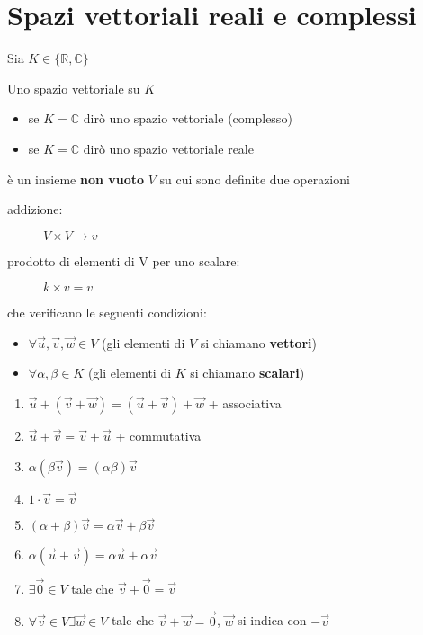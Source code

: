 \section{Spazi vettoriali reali e complessi}
Sia $K\in\{\mathbb{R},\mathbb{C}\}$

Uno spazio vettoriale su $K$
\begin{itemize}
    \item se $K=\mathbb{C}$ dirò uno spazio vettoriale (complesso)
    \item se $K=\mathbb{C}$ dirò uno spazio vettoriale reale
\end{itemize}
è un insieme \textbf{non vuoto} $V$ su cui sono definite due operazioni

\begin{description}
    \item[addizione:] $V \times V \longrightarrow v$
    \item[prodotto di elementi di V per uno scalare:] $k \times v = v$
\end{description}
che verificano le seguenti condizioni:
\begin{itemize}
    \item $\forall \vec{u}, \vec{v}, \vec{w} \in V$ (gli elementi di $V$ si chiamano \textbf{vettori})
    \item $\forall \alpha, \beta \in K$ (gli elementi di $K$ si chiamano \textbf{scalari})
\end{itemize}
\begin{enumerate} 
    \item $\vec{u} + (\vec{v} + \vec{w})=(\vec{u} + \vec{v}) + \vec{w}$ {\hspace{1cm}}+ associativa
    \item $\vec{u}+\vec{v} = \vec{v} + \vec{u}$ {\hspace{1cm}}+ commutativa
    \item $\alpha(\beta\vec{v})=(\alpha\beta)\vec{v}$
    \item $1\cdot \vec{v} = \vec{v}$
    \item $(\alpha + \beta)\vec{v}=\alpha\vec{v} + \beta\vec{v}$
    \item $\alpha (\vec{u} + \vec{v})= \alpha\vec{u} + \alpha\vec{v}$
    \item $\exists\vec{0}\in V$ tale che $\vec{v}+\vec{0}=\vec{v}$
    \item $\forall \vec{v} \in V \exists \vec{w}\in V$ tale che $\vec{v}+\vec{w}=\vec{0}$, 
        \hspace{1cm} $\vec{w}$ 
        si indica con $-\vec{v}$
\end{enumerate}
